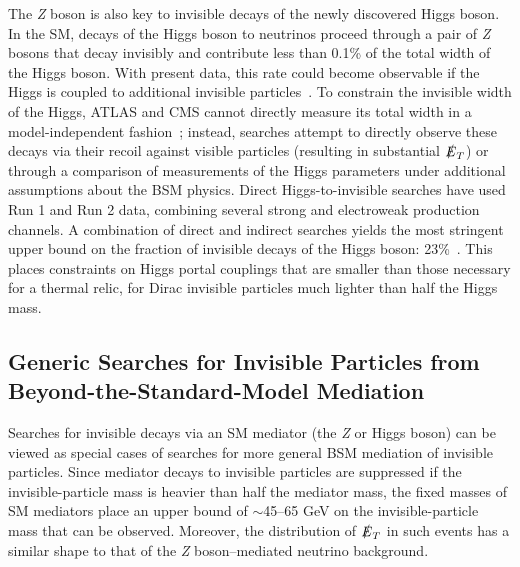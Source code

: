 \documentclass{ar-1col}
\newcommand{\IP}{invisible particle}
\newcommand{\MET}{\ensuremath{\slashed{E}_T}\xspace}
\begin{document}
The \textit{Z} boson is also key to invisible decays of the
newly discovered Higgs boson. In the SM, decays of the Higgs boson to neutrinos proceed through a pair of \textit{Z} bosons that decay invisibly and contribute less than 0.1\% of the total width of the Higgs boson. With
present data, this rate could become observable if the Higgs is
coupled to additional
{\IP}s~\cite{Khachatryan:2016vau,Aad:2015pla}. To constrain the
invisible width of the Higgs, ATLAS and CMS cannot directly
measure its total width in a model-independent
fashion~\cite{Dobrescu:2012td}; instead, searches attempt to
directly observe these decays via their recoil against visible
particles (resulting in substantial \MET) or through a comparison of measurements of the
Higgs parameters under additional assumptions about the BSM
physics. Direct Higgs-to-invisible searches have used Run 1 and
Run 2 data, combining several strong and electroweak production
channels. A combination of direct and indirect searches yields the most
stringent upper bound on the fraction of invisible decays of the Higgs
boson: 23\%~\cite{Khachatryan:2016whc,Aad:2015pla}. This places
constraints on Higgs portal couplings that are smaller than those necessary for a thermal relic, 
for Dirac {\IP}s much lighter than half the Higgs mass.

\subsection{Generic Searches for Invisible Particles from Beyond-the-Standard-Model Mediation}\label{sec:results_monoXSearches}

Searches for invisible decays via an SM mediator (the \textit{Z} or Higgs boson)
can be viewed as special cases of searches for more general BSM
mediation of {\IP}s. Since mediator decays to {\IP}s are
suppressed if the invisible-particle  mass is heavier than half the mediator mass,
the fixed masses of SM mediators place an upper bound of $\sim$45--65 GeV on the invisible-particle mass that can be observed. Moreover, the
distribution of \MET in such events has a similar shape to that of
the \textit{Z} boson--mediated neutrino background.
\end{document}
